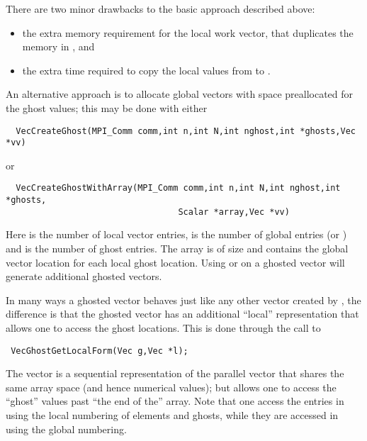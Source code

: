 There are two minor drawbacks to the basic approach described above:
\begin{itemize}
\item the extra memory requirement for the local work vector,  that
      duplicates the memory in , and
\item the extra time required to copy the local values from  to 
      .
\end{itemize}

An alternative approach is to allocate global vectors with space preallocated for 
the ghost values; this may be done with either 
\begin{verbatim}
  VecCreateGhost(MPI_Comm comm,int n,int N,int nghost,int *ghosts,Vec *vv)
\end{verbatim}
or
\begin{verbatim}
  VecCreateGhostWithArray(MPI_Comm comm,int n,int N,int nghost,int *ghosts,
                                  Scalar *array,Vec *vv)
\end{verbatim}
Here    is the 
number of local vector entries,  is the number of 
global entries (or ) and  is the number of 
ghost entries. The array  is of size  and contains the 
global vector location for each local ghost location. Using 
or  on a ghosted vector will generate additional ghosted vectors.

In many ways a ghosted vector behaves just like any other  vector created 
by , the difference is that the ghosted vector has an additional 
``local'' representation that allows one to access the ghost locations. This is done
through the call to  
\begin{verbatim}
 VecGhostGetLocalForm(Vec g,Vec *l);
\end{verbatim}
The vector  is a 
sequential representation of the parallel vector  
that shares the same array space (and hence numerical values); but allows one to 
access the ``ghost'' values past ``the end of the'' array. Note that one access the 
entries in  using the local numbering of elements and ghosts, while they 
are accessed in  using the global numbering.

